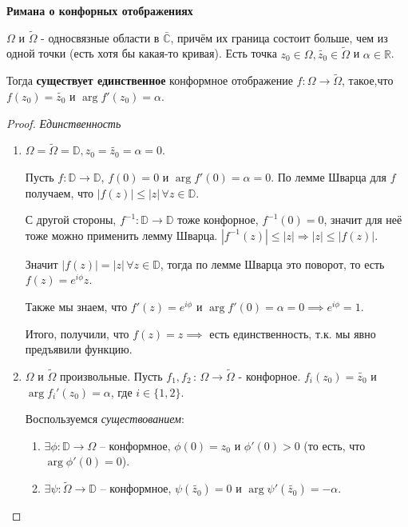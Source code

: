 \begin{theorem}
    \textbf{Римана о конфорных отображениях}

    $\Omega$ и $\tilde{\Omega}$ - односвязные области в $\bar{\mathbb{C}}$, причём их
    граница состоит больше, чем из одной точки (есть хотя бы какая-то кривая).
    Есть точка $z_0 \in \Omega, \tilde{z_0} \in \tilde{\Omega}$ и $\alpha \in \mathbb{R}$.

    Тогда \textbf{существует единственное} конформное отображение $f : \Omega \to \tilde{\Omega}$, такое,что
    $f(z_0) = \tilde{z_0}$ и $\arg f'(z_0) = \alpha$.
\end{theorem}

\begin{proof}
    \textit{Единственность}

    \begin{enumerate}
        \item {
            $\Omega = \tilde{\Omega} = \mathbb{D}, z_0 = \tilde{z_0} = \alpha = 0$.

            Пусть $f : \mathbb{D} \to \mathbb{D}$, $f(0) = 0$ и $\arg f'(0) = \alpha = 0$.
            По лемме Шварца для $f$ получаем, что $|f(z)| \leqslant |z| \, \forall z \in \mathbb{D}$.

            С другой стороны, $f^{-1} : \mathbb{D} \to \mathbb{D}$ тоже конфорное, $f^{-1}(0) = 0$, значит для
            неё тоже можно применить лемму Шварца. $|f^{-1}(z)| \leqslant |z| \Rightarrow |z| \leqslant |f(z)|$.

            Значит $|f(z)| = |z| \, \forall z \in \mathbb{D}$, тогда по лемме Шварца это поворот, то есть $f(z) = e^{i\phi}z$.

            Также мы знаем, что $f'(z) = e^{i\phi}$ и $\arg f'(0) = \alpha = 0 \implies e^{i\phi} = 1$.

            Итого, получили, что $f(z) = z \implies$ есть единственность, т.к. мы явно предъявили функцию.
        }
        \item {
            $\Omega$ и $\tilde{\Omega}$ произвольные. Пусть $f_1, f_2 \, : \, \Omega \to \tilde{\Omega}$ - конфорное.
            $f_i(z_0) = \tilde{z_0}$ и $\arg f_i' (z_0) = \alpha$, где $i \in \{1, 2\}$.

            Воспользуемся \textit{существованием}:

            \begin{enumerate}
                \item {
                    $\exists \phi : \mathbb{D} \rightarrow \Omega$ -- конформное, $\phi(0) = z_0$ и $\phi'(0) > 0$ (то есть, что $\arg \phi'(0) = 0$).
                }
                \item {
                    $\exists \psi : \tilde{\Omega} \rightarrow \mathbb{D}$ -- конформное, $\psi(\tilde{z_0}) = 0$ и $\arg \psi'(\tilde{z_0}) = -\alpha$.
                }
            \end{enumerate}

}
\end{enumerate}
\end{proof}
